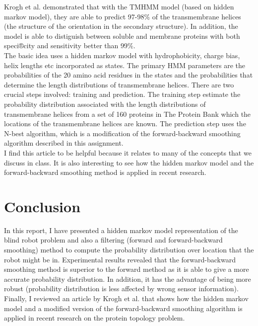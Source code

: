 \documentclass[9.5pt]{extarticle}
\begin{document}
Krogh et al. demonstrated that with the TMHMM model (based on hidden markov model), they are able to predict 97-98\% of the transmembrane helices (the structure of the orientation in the secondary structure). In addition, the model is able to distiguish between soluble and membrane proteins with both speci®city and sensitivity better than 99\%.\\

The basic idea uses a hidden markov model with hydrophobicity, charge bias, helix lengths etc incorporated as states. The primary HMM parameters are the probabilities of the 20 amino acid residues in the states and the probabilities that determine the length distributions of transmembrane helices. There are two crucial steps involved: training and prediction. The training step estimate the probability distribution associated with the length distributions of transmembrane helices from a set of 160 proteins in The Protein Bank which the locations of the transmembrane helices are known. The prediction step uses the N-best algorithm, which is a modification of the forward-backward smoothing algorithm described in this assignment.\\

I find this article to be helpful because it relates to many of the concepts that we discuss in class. It is also interesting to see how the hidden markov model and the forward-backward smoothing method is applied in recent research.\\


\section{Conclusion}

In this report, I have presented a hidden markov model representation of the blind robot problem and also a filtering (forward and forward-backward smoothing) method to compute the probability distribution over location that the robot might be in. Experimental results revealed that the forward-backward smoothing method is superior to the forward method as it is able to give a more accurate probability distribution. In addition, it has the advantage of being more robust (probability distribution is less affected by wrong sensor information). Finally, I reviewed an article by Krogh et al. that shows how the hidden markov model and a modified version of the forward-backward smoothing algorithm is applied in recent research on the protein topology problem.
\end{document}
